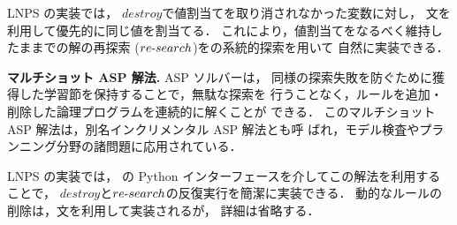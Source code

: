 LNPS の実装では，
$destroy$で値割当てを取り消されなかった変数に対し，
文を利用して優先的に同じ値を割当てる．
これにより，値割当てをなるべく維持したままでの解の再探索
($re\mathchar`-search$)を{\clingo}の系統的探索を用いて
自然に実装できる．

\textbf{マルチショット ASP 解法.}
ASP ソルバー{\clingo}は，
同様の探索失敗を防ぐために獲得した学習節を保持することで，無駄な探索を
行うことなく，ルールを追加・削除した論理プログラムを連続的に解くことが
できる．
このマルチショット ASP 解法は，別名インクリメンタル ASP 解法とも呼
ばれ，モデル検査やプランニング分野の諸問題に応用されている．

LNPS の実装では，
{\clingo}の Python インターフェースを介してこの解法を利用することで，
$destroy$と$re\mathchar`-search$の反復実行を簡潔に実装できる．
動的なルールの削除は，文を利用して実装されるが，
詳細は省略する．

